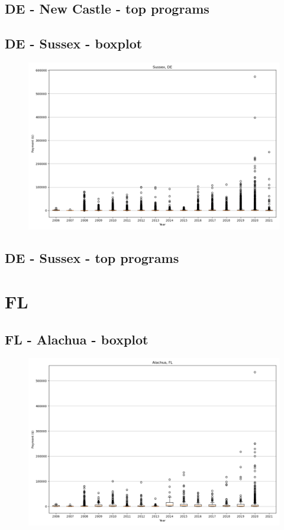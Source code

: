 \subsection*{DE - New Castle - top programs}

\newpage
\subsection*{DE - Sussex - boxplot}
\begin{figure}[h]
\centering
\includegraphics[width=7in]{../output/boxplots/counties/Sussex-DE_boxplot.png}
\end{figure}


\subsection*{DE - Sussex - top programs}

\newpage
\section*{FL}
\subsection*{FL - Alachua - boxplot}
\begin{figure}[h]
\centering
\includegraphics[width=7in]{../output/boxplots/counties/Alachua-FL_boxplot.png}
\end{figure}



